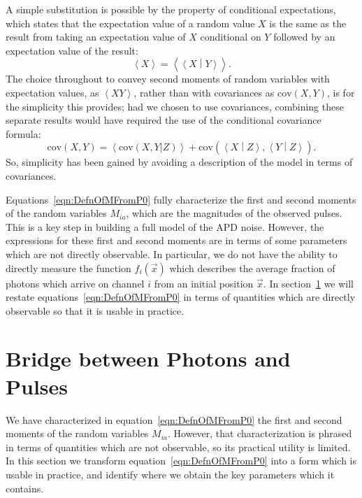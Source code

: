 A simple substitution is possible by the property of conditional expectations, which states that the expectation value of a random value $X$ is the same as the result from taking an expectation value of $X$ conditional on $Y$ followed by an expectation value of the result:~\cite{ProbabilityTextbook}
\begin{equation}
\left<X \right> = \left< \left< X \middle\vert Y\right>\right>.
\end{equation}
The choice throughout to convey second moments of random variables with expectation values, as $\left<XY\right>$, rather than with covariances as $\mathrm{cov}(X,Y)$, is for the simplicity this provides; had we chosen to use covariances, combining these separate results would have required the use of the conditional covariance formula:~\cite{ProbabilityTextbook}
\begin{equation}
\mathrm{cov}(X,Y) = \left<\mathrm{cov}(X,Y \vert Z)\right> + \mathrm{cov}\left(\left<X\middle\vert Z\right>, \left<Y\middle\vert Z\right>\right).
\end{equation}
So, simplicity has been gained by avoiding a description of the model in terms of covariances.

Equations~\ref{eqn:DefnOfMFromP0} fully characterize the first and second moments of the random variables $M_{ia}$, which are the magnitudes of the observed pulses.  This is a key step in building a full model of the APD noise.  However, the expressions for these first and second moments are in terms of some parameters which are not directly observable.  In particular, we do not have the ability to directly measure the function $f_i(\vec{x})$ which describes the average fraction of photons which arrive on channel $i$ from an initial position $\vec{x}$.  In section~\ref{sec:BridgePhotonsPulses} we will restate equations~\ref{eqn:DefnOfMFromP0} in terms of quantities which are directly observable so that it is usable in practice.

\section{Bridge between Photons and Pulses}\label{sec:BridgePhotonsPulses}

We have characterized in equation~\ref{eqn:DefnOfMFromP0} the first and second moments of the random variables $M_{ia}$.  However, that characterization is phrased in terms of quantities which are not observable, so its practical utility is limited.  In this section we transform equation~\ref{eqn:DefnOfMFromP0} into a form which is usable in practice, and identify where we obtain the key parameters which it contains.


